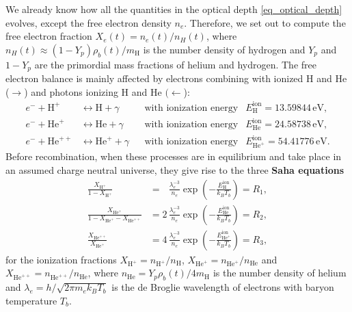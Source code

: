 \documentclass[10pt,a4paper]{article}
\begin{document}
We already know how all the quantities in the optical depth \eqref{eq_optical_depth} evolves, except the free electron density $n_e$.
Therefore, we set out to compute the free electron fraction $X_e(t) = n_e(t) / n_H(t)$,
where $n_H(t) \approx (1-Y_p) \rho_b(t) / m_\text{H}$ is the number density of hydrogen and
$Y_p$ and $1-Y_p$ are the primordial mass fractions of helium and hydrogen.
The free electron balance is mainly affected by
electrons combining with ionized H and He ($\rightarrow$)
and photons ionizing H and He $(\leftarrow$):
\begin{subequations}
\begin{align}
	e^- + \text{H}^+ &\leftrightarrow \text{H} + \gamma && \text{with ionization energy} & E_\text{H}^\text{ion} = 13.59844\,\mathrm{eV}, \\
	e^- + \text{He}^+ &\leftrightarrow \text{He} + \gamma && \text{with ionization energy} & E_\text{He}^\text{ion} = 24.58738\,\mathrm{eV}, \\
	e^- + \text{He}^{++} &\leftrightarrow \text{He}^+ + \gamma && \text{with ionization energy} & E_{\text{He}^+}^\text{ion} = 54.41776\,\mathrm{eV}.
\end{align}%
\label{eq_recombinations}%
\end{subequations}%
Before recombination, when these processes are in equilibrium and take place in an assumed charge neutral universe,
they give rise to the three \textbf{Saha equations}
\newcommand{\XHp}{X_{\text{H}^+}}
\newcommand{\XHep}{X_{\text{He}^+}}
\newcommand{\XHepp}{X_{\text{He}^{++}}}
\begin{subequations}
\begin{align}
    \frac{\XHp}{1-\XHp} &= \phantom{1} \, \frac{\lambda_e^{-3}}{n_e} \exp\left(-\frac{E^\text{ion}_\text{H}}{k_B T_b}\right) = R_1, \\
    \frac{\XHep}{1 - \XHep - \XHepp} &= 2 \, \frac{\lambda_e^{-3}}{n_e} \exp \left(-\frac{E^\text{ion}_\text{He}}{k_B T_b} \right) = R_2, \\
    \frac{\XHepp}{\XHep} &= 4 \, \frac{\lambda_e^{-3}}{n_e} \exp\left(-\frac{E^\text{ion}_{\text{He}^+}}{k_B T_b}\right) = R_3,
\end{align}%
\label{eq_saha_H_He}%
\end{subequations}%
for the ionization fractions $\XHp = n_{\text{H}^+} / n_\text{H}$, $\XHep = n_{\text{He}^+} / n_\text{He}$ and $\XHepp = n_{\text{He}^{++}} / n_\text{He}$,
where $n_\text{He} = Y_p \rho_b(t) / 4 m_\text{H}$ is the number density of helium and $\lambda_e = h / \sqrt{2 \pi m_e k_B T_b}$ is the de Broglie wavelength of electrons with baryon temperature $T_b$.
\end{document}
